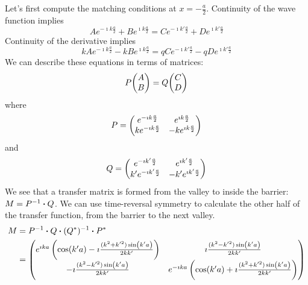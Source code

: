 \documentclass[a4paper,twoside]{article}
\begin{document}
\begin{itemize}
\begin{problem}
            Let's first compute the matching conditions at $ x = - \frac{a}{2} $. Continuity of the wave function implies
            \begin{equation}
                A e^{-\imath k \frac{a}{2}} + B e^{\imath k \frac{a}{2}} = C e^{-\imath k' \frac{a}{2}} + D e^{\imath k' \frac{a}{2}} 
            \end{equation}
            Continuity of the derivative implies
            \begin{equation}
                k A e^{- \imath k \frac{a}{2}} - k B e^{\imath k \frac{a}{2}} = q C e^{- \imath k' \frac{a}{2}} - q D e^{\imath k' \frac{a}{2}}
            \end{equation}
            We can describe these equations in terms of matrices:
            \begin{equation}
                P \mqty(A \\ B) = Q \mqty(C \\ D) 
            \end{equation}
            where
            \begin{equation}
                P = \mqty(e^{-\imath k \frac{a}{2}} & e^{\imath k \frac{a}{2}} \\ k e^{- \imath k \frac{a}{2}} & - k e^{\imath k \frac{a}{2}})
            \end{equation}
            and
            \begin{equation}
                Q = \mqty(e^{-\imath k' \frac{a}{2}} & e^{\imath k' \frac{a}{2}} \\ k' e^{- \imath k' \frac{a}{2}} & - k' e^{\imath k' \frac{a}{2}})
            \end{equation}
            We see that a transfer matrix is formed from the valley to inside the barrier: $ M = P^{-1} \vdot Q $. We can use time-reversal symmetry to calculate the other half of the transfer function, from the barrier to the next valley.
            \begin{align}
                M &= P^{-1} \vdot Q \vdot (Q^*)^{-1} \vdot P^* \\
                &= \mqty(e^{\imath k a} \left( \cos(k'a) - \imath \frac{(k^2 + k'^2) \sin(k'a)}{2kk'} \right) & \imath \frac{(k^2 - k'^2) \sin(k'a)}{2kk'} \\ - \imath \frac{(k^2 - k'^2) \sin(k'a)}{2kk'} & e^{- \imath ka} \left( \cos(k'a) + \imath \frac{(k^2 + k'^2) \sin(k'a)}{2kk'} \right))
            \end{align}
        \end{problem}

\end{itemize}
\end{document}
